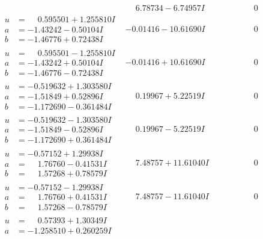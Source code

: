 \documentclass[1p]{elsarticle_modified}
\theoremstyle{definition}
\begin{document}
$$\begin{array}{c|c|c}
 & \phantom{-}6.78734 - 6.74957 I & \phantom{-0.000000 } 0 \\ \hline\begin{aligned}
u &= \phantom{-}0.595501 + 1.255810 I \\
a &= -1.43242 - 0.50104 I \\
b &= -1.46776 + 0.72438 I\end{aligned}
 & -0.01416 - 10.61690 I & \phantom{-0.000000 } 0 \\ \hline\begin{aligned}
u &= \phantom{-}0.595501 - 1.255810 I \\
a &= -1.43242 + 0.50104 I \\
b &= -1.46776 - 0.72438 I\end{aligned}
 & -0.01416 + 10.61690 I & \phantom{-0.000000 } 0 \\ \hline\begin{aligned}
u &= -0.519632 + 1.303580 I \\
a &= -1.51849 + 0.52896 I \\
b &= -1.172690 - 0.361484 I\end{aligned}
 & \phantom{-}0.19967 + 5.22519 I & \phantom{-0.000000 } 0 \\ \hline\begin{aligned}
u &= -0.519632 - 1.303580 I \\
a &= -1.51849 - 0.52896 I \\
b &= -1.172690 + 0.361484 I\end{aligned}
 & \phantom{-}0.19967 - 5.22519 I & \phantom{-0.000000 } 0 \\ \hline\begin{aligned}
u &= -0.57152 + 1.29938 I \\
a &= \phantom{-}1.76760 - 0.41531 I \\
b &= \phantom{-}1.57268 + 0.78579 I\end{aligned}
 & \phantom{-}7.48757 + 11.61040 I & \phantom{-0.000000 } 0 \\ \hline\begin{aligned}
u &= -0.57152 - 1.29938 I \\
a &= \phantom{-}1.76760 + 0.41531 I \\
b &= \phantom{-}1.57268 - 0.78579 I\end{aligned}
 & \phantom{-}7.48757 - 11.61040 I & \phantom{-0.000000 } 0 \\ \hline\begin{aligned}
u &= \phantom{-}0.57393 + 1.30349 I \\
a &= -1.258510 + 0.260259 I \\

\end{aligned}
\end{array}$$
\end{document}

